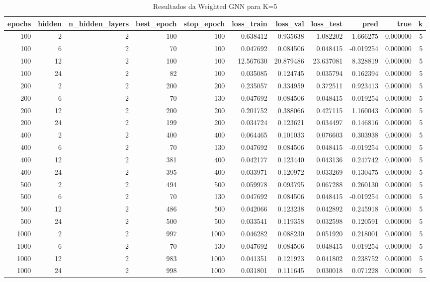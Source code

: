 \begin{table}
\caption{Resultados da Weighted GNN para K=5}
\label{tab:weighted_gnn_results_k5}
\begin{tabular}{rrrrrrrrrrr}
\toprule
epochs & hidden & n\_hidden\_layers & best\_epoch & stop\_epoch & loss\_train & loss\_val & loss\_test & pred & true & k \\
\midrule
100 & 2 & 2 & 100 & 100 & 0.638412 & 0.935638 & 1.082202 & 1.666275 & 0.000000 & 5 \\
100 & 6 & 2 & 70 & 100 & 0.047692 & 0.084506 & 0.048415 & -0.019254 & 0.000000 & 5 \\
100 & 12 & 2 & 100 & 100 & 12.567630 & 20.879486 & 23.637081 & 8.328819 & 0.000000 & 5 \\
100 & 24 & 2 & 82 & 100 & 0.035085 & 0.124745 & 0.035794 & 0.162394 & 0.000000 & 5 \\
200 & 2 & 2 & 200 & 200 & 0.235057 & 0.334959 & 0.372511 & 0.923413 & 0.000000 & 5 \\
200 & 6 & 2 & 70 & 130 & 0.047692 & 0.084506 & 0.048415 & -0.019254 & 0.000000 & 5 \\
200 & 12 & 2 & 200 & 200 & 0.201752 & 0.388066 & 0.427115 & 1.160043 & 0.000000 & 5 \\
200 & 24 & 2 & 199 & 200 & 0.034724 & 0.123621 & 0.034497 & 0.146816 & 0.000000 & 5 \\
400 & 2 & 2 & 400 & 400 & 0.064465 & 0.101033 & 0.076603 & 0.303938 & 0.000000 & 5 \\
400 & 6 & 2 & 70 & 130 & 0.047692 & 0.084506 & 0.048415 & -0.019254 & 0.000000 & 5 \\
400 & 12 & 2 & 381 & 400 & 0.042177 & 0.123440 & 0.043136 & 0.247742 & 0.000000 & 5 \\
400 & 24 & 2 & 395 & 400 & 0.033971 & 0.120972 & 0.033269 & 0.130475 & 0.000000 & 5 \\
500 & 2 & 2 & 494 & 500 & 0.059978 & 0.093795 & 0.067288 & 0.260130 & 0.000000 & 5 \\
500 & 6 & 2 & 70 & 130 & 0.047692 & 0.084506 & 0.048415 & -0.019254 & 0.000000 & 5 \\
500 & 12 & 2 & 486 & 500 & 0.042066 & 0.123238 & 0.042892 & 0.245918 & 0.000000 & 5 \\
500 & 24 & 2 & 500 & 500 & 0.033541 & 0.119358 & 0.032598 & 0.120591 & 0.000000 & 5 \\
1000 & 2 & 2 & 997 & 1000 & 0.046282 & 0.088230 & 0.051920 & 0.218001 & 0.000000 & 5 \\
1000 & 6 & 2 & 70 & 130 & 0.047692 & 0.084506 & 0.048415 & -0.019254 & 0.000000 & 5 \\
1000 & 12 & 2 & 983 & 1000 & 0.041351 & 0.121923 & 0.041802 & 0.238752 & 0.000000 & 5 \\
1000 & 24 & 2 & 998 & 1000 & 0.031801 & 0.111645 & 0.030018 & 0.071228 & 0.000000 & 5 \\
\bottomrule
\end{tabular}
\end{table}
